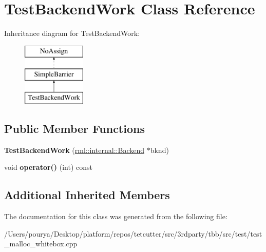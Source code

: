 \hypertarget{classTestBackendWork}{}\section{Test\+Backend\+Work Class Reference}
\label{classTestBackendWork}
Inheritance diagram for Test\+Backend\+Work\+:\begin{figure}[H]
\begin{center}
\leavevmode
\includegraphics[height=3.000000cm]{classTestBackendWork}
\end{center}
\end{figure}
\subsection*{Public Member Functions}
\begin{DoxyCompactItemize}
\item 
\hypertarget{classTestBackendWork_ae2bb58206b2ed8554a95e686af3b1e85}{}{\bfseries Test\+Backend\+Work} (\hyperlink{classrml_1_1internal_1_1Backend}{rml\+::internal\+::\+Backend} $\ast$bknd)\label{classTestBackendWork_ae2bb58206b2ed8554a95e686af3b1e85}

\item 
\hypertarget{classTestBackendWork_ae68af6092e862cd9ddb895a07740142f}{}void {\bfseries operator()} (int) const \label{classTestBackendWork_ae68af6092e862cd9ddb895a07740142f}

\end{DoxyCompactItemize}
\subsection*{Additional Inherited Members}


The documentation for this class was generated from the following file\+:\begin{DoxyCompactItemize}
\item 
/\+Users/pourya/\+Desktop/platform/repos/tetcutter/src/3rdparty/tbb/src/test/test\+\_\+malloc\+\_\+whitebox.\+cpp\end{DoxyCompactItemize}

